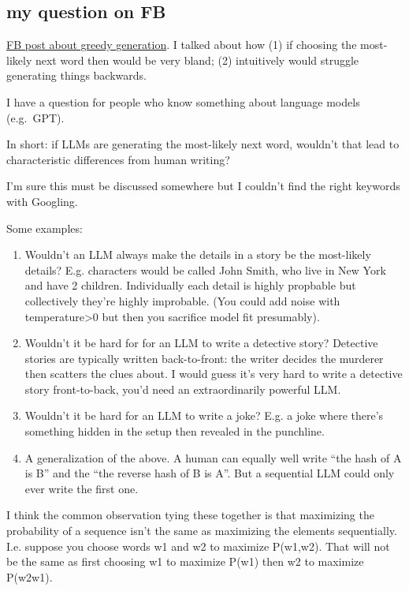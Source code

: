 \documentclass[
  11pt,
  letterpaper,
  DIV=11,
  numbers=noendperiod,
  oneside]{scrartcl}
\begin{document}
\hypertarget{my-question-on-fb}{%
\subsection{my question on FB}\label{my-question-on-fb}}

\href{https://www.facebook.com/tom.cunningham.374549/posts/pfbid02jAmXGWR2ZpAHadAmMPqcaunffuJoVrEsSRcemH3fUt65TxkKxsW3gpSj9KGWCqgEl}{FB
post about greedy generation}. I talked about how (1) if choosing the
most-likely next word then would be very bland; (2) intuitively would
struggle generating things backwards.

I have a question for people who know something about language models
(e.g.~GPT).

In short: if LLMs are generating the most-likely next word, wouldn't
that lead to characteristic differences from human writing?

I'm sure this must be discussed somewhere but I couldn't find the right
keywords with Googling.

Some examples:

\begin{enumerate}
\def\labelenumi{\arabic{enumi}.}
\item
  Wouldn't an LLM always make the details in a story be the most-likely
  details? E.g. characters would be called John Smith, who live in New
  York and have 2 children. Individually each detail is highly propbable
  but collectively they're highly improbable. (You could add noise with
  temperature\textgreater0 but then you sacrifice model fit presumably).
\item
  Wouldn't it be hard for for an LLM to write a detective story?
  Detective stories are typically written back-to-front: the writer
  decides the murderer then scatters the clues about. I would guess it's
  very hard to write a detective story front-to-back, you'd need an
  extraordinarily powerful LLM.
\item
  Wouldn't it be hard for an LLM to write a joke? E.g. a joke where
  there's something hidden in the setup then revealed in the punchline.
\item
  A generalization of the above. A human can equally well write ``the
  hash of A is B'' and the ``the reverse hash of B is A''. But a
  sequential LLM could only ever write the first one.
\end{enumerate}

I think the common observation tying these together is that maximizing
the probability of a sequence isn't the same as maximizing the elements
sequentially. I.e. suppose you choose words w1 and w2 to maximize
P(w1,w2). That will not be the same as first choosing w1 to maximize
P(w1) then w2 to maximize P(w2\textbar w1).
\end{document}
